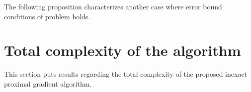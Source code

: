 \documentclass[12pt]{article}
\begin{document}
        The following proposition characterizes another case where error bound conditions of problem holds. 
        \begin{proposition}\label{prop:plq-pp}
            
        \end{proposition}
        \begin{proposition}\label{prop:plq-prox-problem}
            
        \end{proposition}
        \begin{example}\label{example:inn-lp-lin-cnvg}
            
        \end{example}



\section{Total complexity of the algorithm}
    This section puts results regarding the total complexity of the proposed inexact proximal gradient algorithm. 
\end{document}

